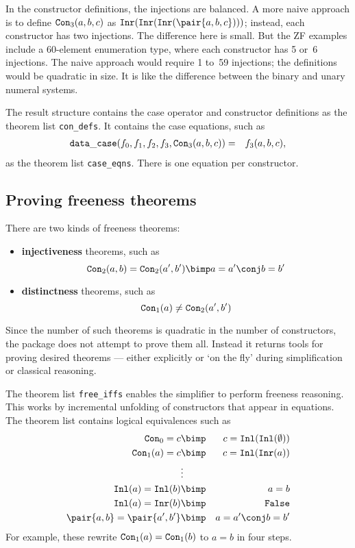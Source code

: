 In the constructor definitions, the injections are balanced.  A more naive
approach is to define $\hbox{\tt Con}_3(a,b,c)$ as
$\Inr(\Inr(\Inr(\pair{a,b,c})))$; instead, each constructor has two
injections.  The difference here is small.  But the ZF examples include a
60-element enumeration type, where each constructor has 5 or~6 injections.
The naive approach would require 1 to~59 injections; the definitions would be
quadratic in size.  It is like the difference between the binary and unary
numeral systems. 

The result structure contains the case operator and constructor definitions as
the theorem list \verb|con_defs|. It contains the case equations, such as 
\begin{eqnarray*}
  {\tt data\_case}(f_0,f_1,f_2,f_3,\hbox{\tt Con}_3(a,b,c)) & = & f_3(a,b,c),
\end{eqnarray*}
as the theorem list \verb|case_eqns|.  There is one equation per constructor.

\subsection{Proving freeness theorems}
There are two kinds of freeness theorems:
\begin{itemize}
\item {\bf injectiveness} theorems, such as
\[ \Con_2(a,b) = \Con_2(a',b') \bimp a=a' \conj b=b' \]

\item {\bf distinctness} theorems, such as
\[ \hbox{\tt Con}_1(a) \not= \hbox{\tt Con}_2(a',b')  \]
\end{itemize}
Since the number of such theorems is quadratic in the number of constructors,
the package does not attempt to prove them all.  Instead it returns tools for
proving desired theorems --- either explicitly or `on the fly' during
simplification or classical reasoning.

The theorem list \verb|free_iffs| enables the simplifier to perform freeness
reasoning.  This works by incremental unfolding of constructors that appear in
equations.  The theorem list contains logical equivalences such as
\begin{eqnarray*}
  \Con_0=c      & \bimp &  c=\Inl(\Inl(\emptyset))     \\
  \Con_1(a)=c   & \bimp &  c=\Inl(\Inr(a))             \\
                & \vdots &                             \\
  \Inl(a)=\Inl(b)   & \bimp &  a=b                     \\
  \Inl(a)=\Inr(b)   & \bimp &  {\tt False}             \\
  \pair{a,b} = \pair{a',b'} & \bimp & a=a' \conj b=b'
\end{eqnarray*}
For example, these rewrite $\hbox{\tt Con}_1(a)=\hbox{\tt Con}_1(b)$ to $a=b$ in four steps.

